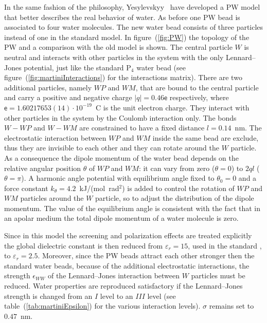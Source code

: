 In the same fashion of the \martini philosophy, Yesylevskyy \etal\, \cite{PW} have developed a \acf{PW} model 
that better describes the real behavior of water. As before one \ac{PW} bead is associated to four water 
molecules. The new water bead consists of three particles instead of one in the standard \martini model. In 
figure~(\ref{fig:PW}) the topology of the \ac{PW} and a comparison with the old model is shown. The central 
particle $W$ is neutral and interacts with other particles in the system with the only Lennard--Jones potential, 
just like the standard P$_4$ water bead (see figure~(\ref{fig:martiniInteractions}) for the interactions matrix). 
There are two additional particles, namely $WP$ and $WM$, that are bound to the central particle and carry a 
positive and negative charge $|q| = 0.46\mathsf{e}$ respectively, where 
$\mathsf{e} = 1.60217653(14) \cdot 10^{-19}$~C is the unit electron charge. They interact with other particles in 
the system by the Coulomb interaction only. The bonds $W-WP$ and $W-WM$ are constrained to have a fixed distance 
$l = 0.14$~nm. The electrostatic interaction between $WP$ and $WM$ inside the same bead are exclude, thus they 
are invisible to each other and they can rotate around the $W$ particle. As a consequence the dipole momentum of 
the water bead depends on the relative angular position $\theta$ of $WP$ and $WM$: it can vary from zero 
($\theta = 0$) to $2ql$ ($\theta = \pi$). A harmonic angle potential with equilibrium angle fixed to 
$\theta_0 = 0$ and a force constant $k_\theta = 4.2$~kJ/(mol\ rad$^2$) is added to control the rotation of 
$WP$ and $WM$ particles around the $W$ particle, so to adjust the distribution of the dipole momentum. The value 
of the equilibrium angle is consistent with the fact that in an apolar medium the total dipole momentum of a 
water molecule is zero. 

Since in this model the screening and polarization effects are treated explicitly the global dielectric constant 
is then reduced from $\varepsilon_r = 15$, used in the standard \martini, to $\varepsilon_r = 2.5$. Moreover, 
since the \ac{PW} beads attract each other stronger then the standard water beads, because of the additional 
electrostatic interactions, the strength $\epsilon_{WW}$ of the Lennard--Jones interaction between $W$ particles 
must be reduced. Water properties are reproduced satisfactory if the Lennard--Jones strength is changed from an 
$I$ level to an $III$ level (see table~(\ref{tab:martiniEpsilon}) for the various interaction levels). $\sigma$ 
remains set to $0.47$~nm.

